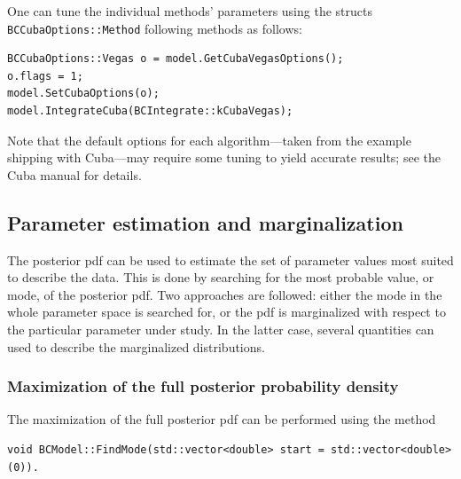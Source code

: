 \documentclass[11pt, a4paper]{article}
\begin{document}
One can tune the individual methods' parameters using the structs
\verb|BCCubaOptions::Method| following methods as follows:
%
\begin{verbatim}
BCCubaOptions::Vegas o = model.GetCubaVegasOptions();
o.flags = 1;
model.SetCubaOptions(o);
model.IntegrateCuba(BCIntegrate::kCubaVegas);
\end{verbatim}
%
Note that the default options for each algorithm---taken from the
example shipping with Cuba---may require some tuning to yield accurate
results; see the Cuba manual for details.


\subsection{Parameter estimation and marginalization}

The posterior pdf can be used to estimate the set of parameter values
most suited to describe the data. This is done by searching for the
most probable value, or mode, of the posterior pdf. Two approaches are
followed: either the mode in the whole parameter space is searched
for, or the pdf is marginalized with respect to the particular
parameter under study. In the latter case, several quantities can used
to describe the marginalized distributions.


\subsubsection{Maximization of the full posterior probability density}

The maximization of the full posterior pdf can be performed using the
method
%
\begin{verbatim}
void BCModel::FindMode(std::vector<double> start = std::vector<double>(0)).
\end{verbatim}
\end{document}
